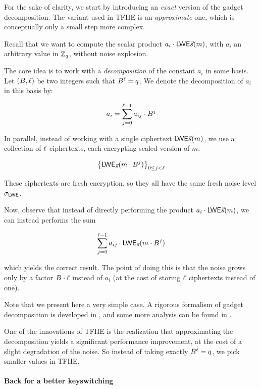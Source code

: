 For the sake of clarity, we start by introducing an \textit{exact} version of the gadget decomposition. The variant used in TFHE is an \textit{approximate} one, which is conceptually only a small step more complex.


Recall that we want to compute the scalar product $a_i \cdot \textsf{LWE}{\vec s}(m)$, with $a_i$ an arbitrary value in $\mathbb{Z}_q$, without noise explosion.

The core idea is to work with a \textit{decomposition} of the constant $a_i$ in some basis. Let $(B, \ell)$ be two integers such that $B^\ell = q$. We denote the decomposition of $a_i$ in this basis by:

\[
	a_i = \sum_{j=0}^{\ell-1} a_{ij} \cdot B^j
\]

In parallel, instead of working with a single ciphertext $\textsf{LWE}{\vec s}(m)$, we use a collection of $\ell$ ciphertexts, each encrypting scaled version of $m$: 

\[
	\left \lbrace \textsf{LWE}_{\vec s}(m \cdot B^j) \right \rbrace_{0 \le j < \ell}
\]

These ciphertexts are fresh encryption, so they all have the same fresh noise level $\sigma_{\textsf{LWE}}$.

Now, observe that instead of directly performing the product $a_i \cdot \textsf{LWE}{\vec s}(m)$, we can instead performs the sum 

\[
	\sum_{j=0}^{\ell - 1} a_{ij} \cdot \textsf{LWE}_{\vec s}(m \cdot B^j)
\]

which yields the correct result. The point of doing this is that the noise grows only by a factor $B \cdot \ell$ instead of $a_i$ (at the cost of storing $\ell$ ciphertexts instead of one).

Note that we present here a very simple case. A rigorous formalism of gadget decomposition is developed in \cite{EC:GenMicPol19}, and some more analysis can be found in \cite{AC:Joye21}.


One of the innovations of TFHE is the realization that approximating the decomposition yields a significant performance improvement, at the cost of a slight degradation of the noise. So instead of taking exactly $B^\ell = q$, we pick smaller values in TFHE.


\paragraph{Back for a better keyswitching}


